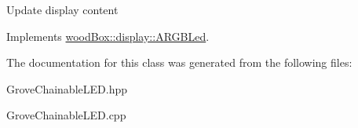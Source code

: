 Update display content 

Implements \mbox{\hyperlink{classwood_box_1_1display_1_1_a_r_g_b_led_ab71f321d91e931f95b96d1f492a9454d}{wood\+Box\+::display\+::\+A\+R\+G\+B\+Led}}.



The documentation for this class was generated from the following files\+:\begin{DoxyCompactItemize}
\item 
Grove\+Chainable\+L\+E\+D.\+hpp\item 
Grove\+Chainable\+L\+E\+D.\+cpp\end{DoxyCompactItemize}
